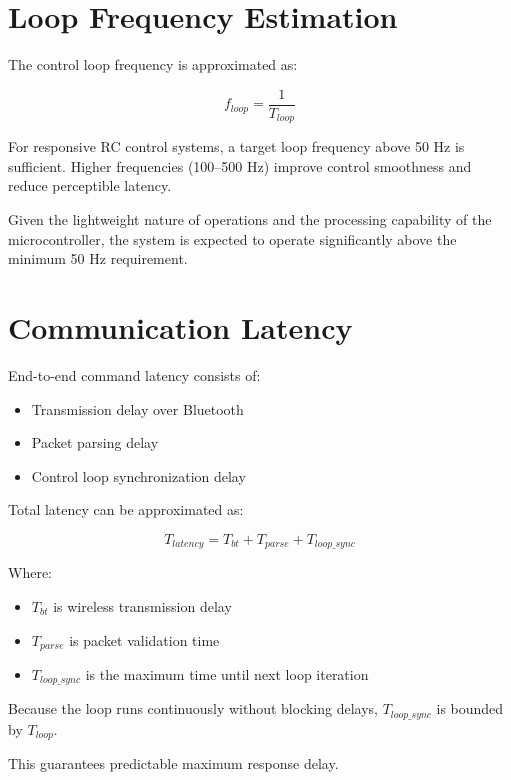 
\section{Loop Frequency Estimation}

The control loop frequency is approximated as:

\[
f_{loop} = \frac{1}{T_{loop}}
\]

For responsive RC control systems, a target loop frequency above 50 Hz is sufficient. 
Higher frequencies (100–500 Hz) improve control smoothness and reduce perceptible latency.

Given the lightweight nature of operations and the processing capability of the microcontroller, 
the system is expected to operate significantly above the minimum 50 Hz requirement.


\section{Communication Latency}

End-to-end command latency consists of:

\begin{itemize}
	\item Transmission delay over Bluetooth
	\item Packet parsing delay
	\item Control loop synchronization delay
\end{itemize}

Total latency can be approximated as:

\[
T_{latency} = T_{bt} + T_{parse} + T_{loop\_sync}
\]

Where:

\begin{itemize}
	\item $T_{bt}$ is wireless transmission delay
	\item $T_{parse}$ is packet validation time
	\item $T_{loop\_sync}$ is the maximum time until next loop iteration
\end{itemize}

Because the loop runs continuously without blocking delays, 
$T_{loop\_sync}$ is bounded by $T_{loop}$.

This guarantees predictable maximum response delay.

